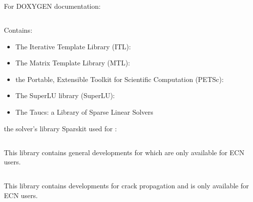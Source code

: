 For DOXYGEN documentation:


\subsection{ }

Contains:

\begin{itemize}
\item  The Iterative Template Library (ITL):   
\item  The Matrix Template Library (MTL):   
\item the Portable, Extensible Toolkit for  Scientific Computation (PETSc):
\item The  SuperLU library (SuperLU): 
\item The  Taucs: a Library of Sparse Linear Solvers 
\end{itemize}

 the solver's library Sparskit used for :


\subsection{ }

This library contains general developments for  which are
only available for ECN users.

\subsection{ }

This library contains  developments for crack propagation and is
only available for ECN users.
